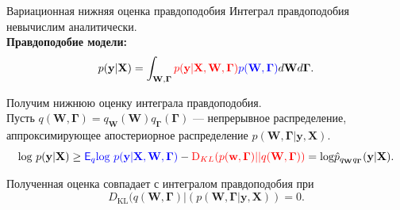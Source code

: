 \documentclass[usenames,dvipsnames,11pt,pdf,utf8,russian,aspectratio=169]{beamer}
\begin{document}
\begin{frame}{Вариационная нижняя оценка правдоподобия} 
Интеграл правдоподобия невычислим аналитически.\\
\textbf{Правдоподобие модели:}
\[
p(\mathbf{y}|\mathbf{X}) =
 \int_{\mathbf{W}, \boldsymbol{\Gamma} } \textcolor{red}{p(\mathbf{y}|\mathbf{X},\mathbf{W},  \boldsymbol{\Gamma})} \textcolor{blue}{p(\mathbf{W}, \boldsymbol{\Gamma})}d\mathbf{W}d{\boldsymbol{\Gamma}}.                         
\]

Получим нижнюю оценку интеграла правдоподобия.\\
Пусть $q(\mathbf{W}, \boldsymbol{\Gamma}) = q_{\mathbf{W}}(\mathbf{W})q_{\boldsymbol{\Gamma}}(\boldsymbol{\Gamma})$ --- непрерывное распределение, аппроксимирующее 
апостериорное распределение $p(\mathbf{W}, \boldsymbol{\Gamma}|\mathbf{y}, \mathbf{X})$.
$$                                                                                                                                              
        \text{log}~p(\mathbf{y}|\mathbf{X}) \geq 
\textcolor{blue}{\mathsf{E}_q \text{log}~{p(\mathbf{y} | \mathbf{X}, \mathbf{W}, \boldsymbol{\Gamma})}} - \textcolor{red}{\text{D}_{KL}(p(\mathbf{w}, \boldsymbol{\Gamma}) || q(\mathbf{W}, \boldsymbol{\Gamma}))} = \text{log}\hat{{p}}_{q_{\mathbf{W}}q_{\boldsymbol{\Gamma}}}(\mathbf{y}|\mathbf{X}).
$$ 

Полученная оценка совпадает с интегралом правдоподобия при $$D_\text{KL}(q(\mathbf{W}, \boldsymbol{\Gamma})|(p(\mathbf{W}, \boldsymbol{\Gamma}|\mathbf{y}, \mathbf{X}))=0.$$

\end{frame}      
\end{document}
